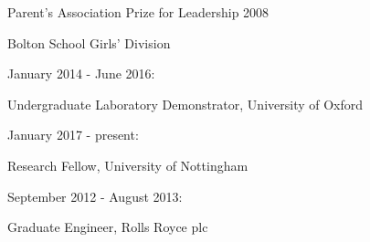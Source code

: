 \documentclass{article}
\begin{document}
\smallskip

\indent Parent's Association Prize for Leadership 2008

\indent \indent Bolton School Girls' Division
\smallskip

\noindent\makebox[\linewidth]{\rule{0.85\paperwidth}{0.2pt}}

\smallskip

\indent January 2014 - June 2016:

\indent \indent Undergraduate Laboratory Demonstrator, University of Oxford

\noindent\makebox[\linewidth]{\rule{0.85\paperwidth}{0.2pt}}


\smallskip

\indent January 2017 - present:

\indent \indent Research Fellow, University of Nottingham 

\smallskip

\indent September 2012 - August 2013:

\indent \indent Graduate Engineer, Rolls Royce plc 














\end{document}
